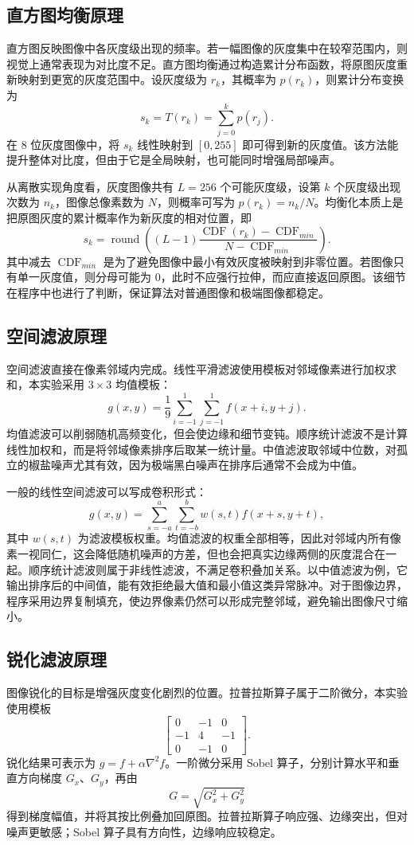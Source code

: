 \documentclass[bwprint]{report}
\begin{document}
\subsection{直方图均衡原理}
直方图反映图像中各灰度级出现的频率。若一幅图像的灰度集中在较窄范围内，则视觉上通常表现为对比度不足。直方图均衡通过构造累计分布函数，将原图灰度重新映射到更宽的灰度范围中。设灰度级为 $r_k$，其概率为 $p(r_k)$，则累计分布变换为
\[
s_k=T(r_k)=\sum_{j=0}^{k}p(r_j).
\]
在 8 位灰度图像中，将 $s_k$ 线性映射到 $[0,255]$ 即可得到新的灰度值。该方法能提升整体对比度，但由于它是全局映射，也可能同时增强局部噪声。

从离散实现角度看，灰度图像共有 $L=256$ 个可能灰度级，设第 $k$ 个灰度级出现次数为 $n_k$，图像总像素数为 $N$，则概率可写为 $p(r_k)=n_k/N$。均衡化本质上是把原图灰度的累计概率作为新灰度的相对位置，即
\[
s_k=\operatorname{round}\left((L-1)\frac{\operatorname{CDF}(r_k)-\operatorname{CDF}_{min}}{N-\operatorname{CDF}_{min}}\right).
\]
其中减去 $\operatorname{CDF}_{min}$ 是为了避免图像中最小有效灰度被映射到非零位置。若图像只有单一灰度值，则分母可能为 0，此时不应强行拉伸，而应直接返回原图。该细节在程序中也进行了判断，保证算法对普通图像和极端图像都稳定。

\subsection{空间滤波原理}
空间滤波直接在像素邻域内完成。线性平滑滤波使用模板对邻域像素进行加权求和，本实验采用 $3\times3$ 均值模板：
\[
g(x,y)=\frac{1}{9}\sum_{i=-1}^{1}\sum_{j=-1}^{1}f(x+i,y+j).
\]
均值滤波可以削弱随机高频变化，但会使边缘和细节变钝。顺序统计滤波不是计算线性加权和，而是将邻域像素排序后取某一统计量。中值滤波取邻域中位数，对孤立的椒盐噪声尤其有效，因为极端黑白噪声在排序后通常不会成为中值。

一般的线性空间滤波可以写成卷积形式：
\[
g(x,y)=\sum_{s=-a}^{a}\sum_{t=-b}^{b}w(s,t)f(x+s,y+t),
\]
其中 $w(s,t)$ 为滤波模板权重。均值滤波的权重全部相等，因此对邻域内所有像素一视同仁，这会降低随机噪声的方差，但也会把真实边缘两侧的灰度混合在一起。顺序统计滤波则属于非线性滤波，不满足卷积叠加关系。以中值滤波为例，它输出排序后的中间值，能有效拒绝最大值和最小值这类异常脉冲。对于图像边界，程序采用边界复制填充，使边界像素仍然可以形成完整邻域，避免输出图像尺寸缩小。

\subsection{锐化滤波原理}
图像锐化的目标是增强灰度变化剧烈的位置。拉普拉斯算子属于二阶微分，本实验使用模板
\[
\begin{bmatrix}
0 & -1 & 0\\
-1 & 4 & -1\\
0 & -1 & 0
\end{bmatrix}.
\]
锐化结果可表示为 $g=f+\alpha\nabla^2 f$。一阶微分采用 Sobel 算子，分别计算水平和垂直方向梯度 $G_x$、$G_y$，再由
\[
G=\sqrt{G_x^2+G_y^2}
\]
得到梯度幅值，并将其按比例叠加回原图。拉普拉斯算子响应强、边缘突出，但对噪声更敏感；Sobel 算子具有方向性，边缘响应较稳定。
\end{document}
